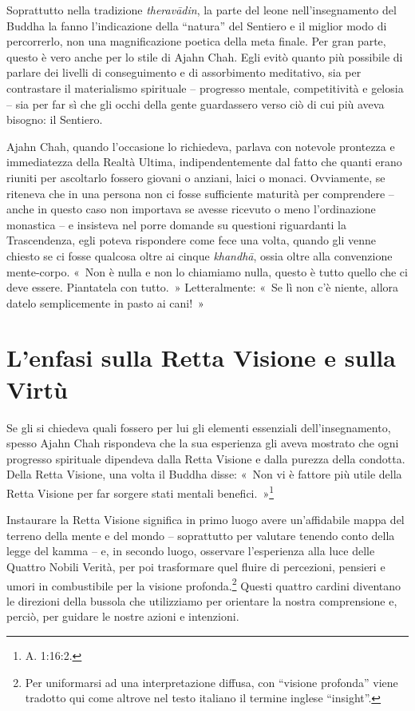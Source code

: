 Soprattutto nella tradizione \emph{theravādin}, la parte del leone
nell'insegnamento del Buddha la fanno l'indicazione della ``natura'' del
Sentiero e il miglior modo di percorrerlo, non una magnificazione
poetica della meta finale. Per gran parte, questo è vero anche per lo
stile di Ajahn Chah. Egli evitò quanto più possibile di parlare dei
livelli di conseguimento e di assorbimento meditativo, sia per
contrastare il materialismo spirituale -- progresso mentale,
competitività e gelosia -- sia per far sì che gli occhi della gente
guardassero verso ciò di cui più aveva bisogno: il Sentiero.

Ajahn Chah, quando l'occasione lo richiedeva, parlava con notevole
prontezza e immediatezza della Realtà Ultima, indipendentemente dal
fatto che quanti erano riuniti per ascoltarlo fossero giovani o anziani,
laici o monaci. Ovviamente, se riteneva che in una persona non ci fosse
sufficiente maturità per comprendere -- anche in questo caso non
importava se avesse ricevuto o meno l'ordinazione monastica -- e
insisteva nel porre domande su questioni riguardanti la Trascendenza,
egli poteva rispondere come fece una volta, quando gli venne chiesto se
ci fosse qualcosa oltre ai cinque \emph{khandhā}, ossia oltre alla
convenzione mente-corpo. «~Non è nulla e non lo chiamiamo nulla, questo
è tutto quello che ci deve essere. Piantatela con tutto.~»
Letteralmente: «~Se lì non c'è niente, allora datelo semplicemente in
pasto ai cani!~»

\section{L'enfasi sulla Retta Visione e sulla Virtù}

Se gli si chiedeva quali fossero per lui gli elementi essenziali
dell'insegnamento, spesso Ajahn Chah rispondeva che la sua esperienza
gli aveva mostrato che ogni progresso spirituale dipendeva dalla Retta
Visione e dalla purezza della condotta. Della Retta Visione, una volta
il Buddha disse: «~Non vi è fattore più utile della Retta Visione per
far sorgere stati mentali benefici.~»\footnote{A. 1:16:2.}

Instaurare la Retta Visione significa in primo luogo avere un'affidabile
mappa del terreno della mente e del mondo -- soprattutto per valutare
tenendo conto della legge del kamma -- e, in secondo luogo,
osservare l'esperienza alla luce delle Quattro Nobili Verità, per poi
trasformare quel fluire di percezioni, pensieri e umori in combustibile
per la visione profonda.\footnote{Per uniformarsi ad una interpretazione
  diffusa, con ``visione profonda'' viene tradotto qui come altrove nel
  testo italiano il termine inglese ``insight''.} Questi quattro cardini
diventano le direzioni della bussola che utilizziamo per orientare la
nostra comprensione e, perciò, per guidare le nostre azioni e
intenzioni.

